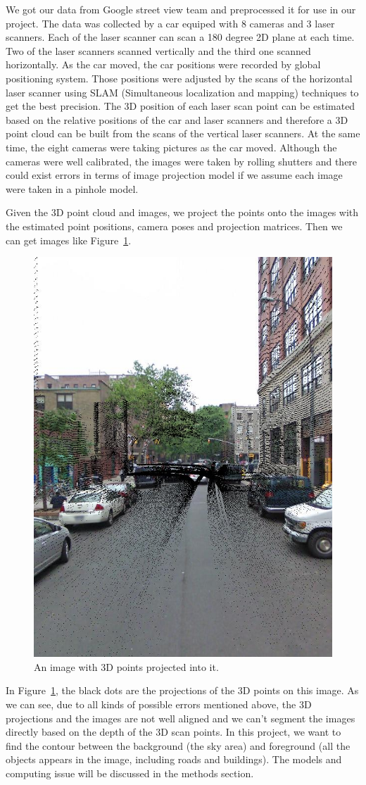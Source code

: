 \documentclass{article} %
\begin{document}
We got our data from Google street view team and preprocessed it for
use in our project. The data was collected by a car equiped
with 8 cameras and 3 laser scanners. Each of the laser scanner can
scan a 180 degree 2D plane at each time. Two of the laser scanners
scanned vertically and the third one scanned horizontally. As the car moved, the car
positions were recorded by global positioning system. Those positions
were adjusted by the scans of the horizontal laser scanner using SLAM
(Simultaneous localization and mapping) techniques to get the best
precision. The 3D position of each laser scan point can be
estimated based on the relative positions of the car and laser
scanners and therefore a 3D point cloud can be built from the scans of
the vertical laser scanners. At the same time, the eight
cameras were taking pictures as the car moved. Although the cameras
were well calibrated, the images were taken by rolling shutters and
there could exist errors in terms of image projection model if we assume each
image were taken in a pinhole model.

Given the 3D point cloud and images, we project the points onto the
images with the estimated point positions, camera poses and projection
matrices. Then we can get images like Figure~\ref{fig-data_image}.

\begin{figure}[h]
\begin{center}
\includegraphics[height=0.5\linewidth]{./fig/overlay_00_00.jpg}
\end{center}
\caption{An image with 3D points projected into it.}
\label{fig-data_image}
\end{figure}

In Figure~\ref{fig-data_image}, the black dots are the projections of
the 3D points on this image. As we can see, due to all kinds of possible
errors mentioned above, the 3D projections and the images are not well
aligned and we can't segment the images directly based on the depth of
the 3D scan points. In this project, we want to find the contour
between the background (the sky area) and foreground (all the objects
appears in the image, including roads and buildings). The models and
computing issue will be discussed in the methods section.
\end{document}

